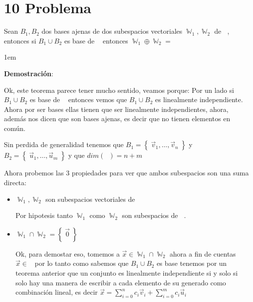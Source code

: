 \documentclass[12pt, fleqn]{article}                             %
\newenvironment{SmallIndentation}[1][0.75em]                    %
        {\begin{adjustwidth}{#1}{}\begin{footnotesize}}             %
        {\end{footnotesize}\end{adjustwidth}}                       %
\theoremstyle{break}                                            %
\DeclareMathOperator \GenericField {\mathbb{F}}                 %
\DeclareMathOperator \VectorSet    {\mathbb{V}}                 %
\DeclareMathOperator \SubVectorSet {\mathbb{W}}                 %
\DeclareMathOperator \VectorSpace  {\VectorSet_{\GenericField}} %
\newcommand{\Set}[1]    {\left\{ \; #1 \; \right\}}             %
\begin{document}
\clearpage
\section{10 Problema}
\label{sec:10}

    Sean $B_1, B_2$ dos bases ajenas de dos subespacios vectoriales $\SubVectorSet_1, \SubVectorSet_2$
    de $\VectorSpace$, entonces si $B_1 \cup B_2$ es base de $\VectorSpace$ entonces 
    $\SubVectorSet_1 \oplus \SubVectorSet_2 = \VectorSpace$

    \begin{SmallIndentation}[1em]
        \textbf{Demostración}:
        
        Ok, este teorema parece tener mucho sentido, veamos porque:
        Por un lado si $B_1 \cup B_2$ es base de $\VectorSpace$ entonces vemos que 
        $B_1 \cup B_2$ es linealmente independiente. Ahora por ser bases ellas tienen que ser 
        linealmente independientes, ahora, además nos dicen que son bases ajenas, es decir
        que no tienen elementos en común.

        Sin perdida de generalidad tenemos que $B_1 = \Set{\vec v_1, \dots, \vec v_n}$ y 
        $B_2 = \Set{\vec u_1, \dots, \vec u_m}$ y que $dim(\VectorSpace) = n + m$

        Ahora probemos las 3 propiedades para ver que ambos subespacios son una suma directa:
        \begin{itemize}
            \item 
                $\SubVectorSet_1, \SubVectorSet_2$ son subespacios vectoriales de $\VectorSpace$

                Por hipotesis tanto $\SubVectorSet_1$ como $\SubVectorSet_2$ son subespacios de 
                $\VectorSpace$.

            \item
                $\SubVectorSet_1 \cap \SubVectorSet_2 = \Set{\vec 0}$

                Ok, para demostar eso, tomemos a $\vec x \in \SubVectorSet_1 \cap \SubVectorSet_2$
                ahora a fin de cuentas $\vec x \in \VectorSpace$ por lo tanto como sabemos que $B_1 \cup B_2$
                es base tenemos por un teorema anterior que un conjunto es linealmente independiente si y solo si solo hay
                una manera de escribir a cada elemento de su generado como combinación lineal, es
                decir $\vec x = \sum_{i=0}^{n} c_i \vec v_i + \sum_{i=0}^{m} c_i \vec u_i$


\end{itemize}
\end{SmallIndentation}
\end{document}
